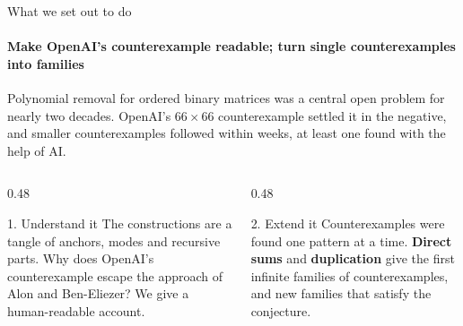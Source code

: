 \documentclass[aspectratio=169,11pt,t]{beamer}
\begin{document}
\begin{frame}{What we set out to do}
\framesubtitle{Make OpenAI's counterexample readable; turn single counterexamples into families}
\small
Polynomial removal for ordered binary matrices was a central open problem for nearly two decades. OpenAI's $66\times66$ counterexample settled it in the negative, and smaller counterexamples followed within weeks, at least one found with the help of AI.

\medskip
\begin{columns}[T]
\begin{column}{0.48\textwidth}
\begin{block}{1. Understand it}
The constructions are a tangle of anchors, modes and recursive parts. Why does OpenAI's counterexample escape the approach of Alon and Ben-Eliezer? We give a human-readable account.
\end{block}
\end{column}
\begin{column}{0.48\textwidth}
\begin{block}{2. Extend it}
Counterexamples were found one pattern at a time. \textbf{Direct sums} and \textbf{duplication} give the first infinite families of counterexamples, and new families that satisfy the conjecture.
\end{block}
\end{column}
\end{columns}

\medskip
\centering
{}
\end{frame}
\end{document}
